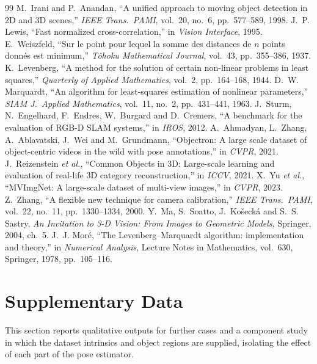 \documentclass[10pt,a4paper,twocolumn]{article}
\begin{document}
\begin{thebibliography}{99}
 M.~Irani and P.~Anandan, ``A unified approach to moving object detection in 2D and 3D scenes,'' \emph{IEEE Trans.\ PAMI}, vol.~20, no.~6, pp.~577--589, 1998.
 J.~P. Lewis, ``Fast normalized cross-correlation,'' in \emph{Vision Interface}, 1995.
 E.~Weiszfeld, ``Sur le point pour lequel la somme des distances de $n$ points donn\'es est minimum,'' \emph{T\^ohoku Mathematical Journal}, vol.~43, pp.~355--386, 1937.
 K.~Levenberg, ``A method for the solution of certain non-linear problems in least squares,'' \emph{Quarterly of Applied Mathematics}, vol.~2, pp.~164--168, 1944.
 D.~W. Marquardt, ``An algorithm for least-squares estimation of nonlinear parameters,'' \emph{SIAM J.\ Applied Mathematics}, vol.~11, no.~2, pp.~431--441, 1963.
 J.~Sturm, N.~Engelhard, F.~Endres, W.~Burgard and D.~Cremers, ``A benchmark for the evaluation of RGB-D SLAM systems,'' in \emph{IROS}, 2012.
 A.~Ahmadyan, L.~Zhang, A.~Ablavatski, J.~Wei and M.~Grundmann, ``Objectron: A large scale dataset of object-centric videos in the wild with pose annotations,'' in \emph{CVPR}, 2021.
 J.~Reizenstein \emph{et al.}, ``Common Objects in 3D: Large-scale learning and evaluation of real-life 3D category reconstruction,'' in \emph{ICCV}, 2021.
 X.~Yu \emph{et al.}, ``MVImgNet: A large-scale dataset of multi-view images,'' in \emph{CVPR}, 2023.
 Z.~Zhang, ``A flexible new technique for camera calibration,'' \emph{IEEE Trans.\ PAMI}, vol.~22, no.~11, pp.~1330--1334, 2000.
 Y.~Ma, S.~Soatto, J.~Ko\v{s}eck\'a and S.~S. Sastry, \emph{An Invitation to 3-D Vision: From Images to Geometric Models}, Springer, 2004, ch.~5.
 J.~J. Mor\'e, ``The Levenberg--Marquardt algorithm: implementation and theory,'' in \emph{Numerical Analysis}, Lecture Notes in Mathematics, vol.~630, Springer, 1978, pp.~105--116.
\end{thebibliography}

\section{Supplementary Data}

This section reports qualitative outputs for further cases and a component study in which the dataset intrinsics and object regions are supplied, isolating the effect of each part of the pose estimator.
\end{document}

